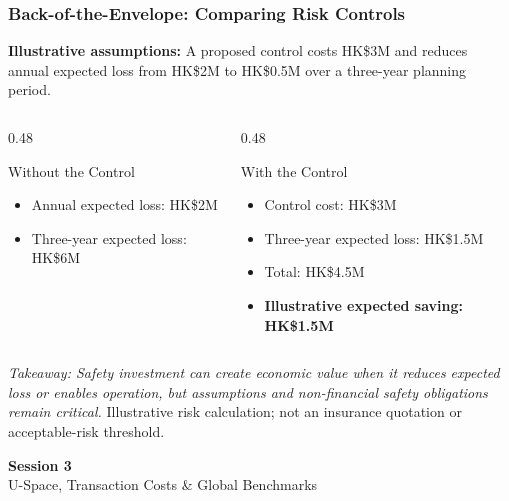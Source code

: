 \documentclass{beamer}
\begin{document}
\begin{frame}[t,shrink=11]
\frametitle{Back-of-the-Envelope: Comparing Risk Controls}
\textbf{Illustrative assumptions:} A proposed control costs HK\$3M and reduces annual expected loss from HK\$2M to HK\$0.5M over a three-year planning period.
\begin{columns}[T]
\begin{column}{0.48\textwidth}\begin{block}{Without the Control}
\begin{itemize}
\item Annual expected loss: HK\$2M
\item Three-year expected loss: HK\$6M
\end{itemize}\end{block}\end{column}
\begin{column}{0.48\textwidth}\begin{block}{With the Control}
\begin{itemize}
\item Control cost: HK\$3M
\item Three-year expected loss: HK\$1.5M
\item Total: HK\$4.5M
\item \textbf{Illustrative expected saving: HK\$1.5M}
\end{itemize}\end{block}\end{column}
\end{columns}
\textit{Takeaway: Safety investment can create economic value when it reduces expected loss or enables operation, but assumptions and non-financial safety obligations remain critical.}
\vfill{\tiny Illustrative risk calculation; not an insurance quotation or acceptable-risk threshold.}
\end{frame}

\begin{frame}[c]
  \begin{center}
    \huge\color{cuhkpurple}\textbf{Session 3}\\
    \vspace{0.5cm}
    \Large U-Space, Transaction Costs \& Global Benchmarks
  \end{center}
\end{frame}
\end{document}
